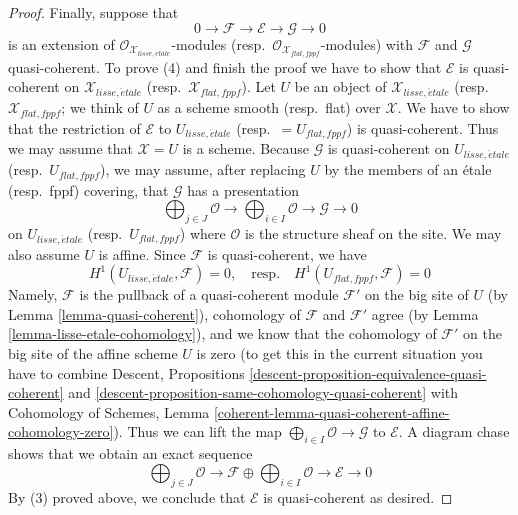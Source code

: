 \documentclass{stacks-project}
\theoremstyle{plain}
\theoremstyle{definition}
\theoremstyle{remark}
\numberwithin{equation}{subsection}
\def\etale{{\acute{e}tale}}
\begin{document}
\begin{proof}
\medskip\noindent
Finally, suppose that
$$
0 \to \mathcal{F} \to \mathcal{E} \to \mathcal{G} \to 0
$$
is an extension of $\mathcal{O}_{\mathcal{X}_{lisse,\etale}}$-modules
(resp.\ $\mathcal{O}_{\mathcal{X}_{flat,fppf}}$-modules) with $\mathcal{F}$
and $\mathcal{G}$ quasi-coherent. To prove (4) and finish the proof
we have to show that
$\mathcal{E}$ is quasi-coherent on $\mathcal{X}_{lisse,\etale}$
(resp.\ $\mathcal{X}_{flat,fppf}$). Let $U$
be an object of $\mathcal{X}_{lisse,\etale}$
(resp.\ $\mathcal{X}_{flat,fppf}$; we think of $U$ as a scheme smooth
(resp.\ flat) over $\mathcal{X}$. We have to show that the restriction
of $\mathcal{E}$ to $U_{lisse,\etale}$ (resp.\ $=U_{flat,fppf}$)
is quasi-coherent. Thus we may assume
that $\mathcal{X} = U$ is a scheme. Because $\mathcal{G}$
is quasi-coherent on $U_{lisse,\etale}$ (resp.\ $U_{flat,fppf}$),
we may assume, after replacing $U$ by the members
of an \'etale (resp.\ fppf) covering, that $\mathcal{G}$ has a
presentation
$$
\bigoplus\nolimits_{j \in J} \mathcal{O} \longrightarrow
\bigoplus\nolimits_{i \in I} \mathcal{O} \longrightarrow
\mathcal{G} \longrightarrow 0
$$
on $U_{lisse,\etale}$ (resp.\ $U_{flat,fppf}$) where $\mathcal{O}$
is the structure sheaf on the site. We may also assume $U$ is affine.
Since $\mathcal{F}$ is quasi-coherent, we have
$$
H^1(U_{lisse,\etale}, \mathcal{F}) = 0,
\quad\text{resp.}\quad
H^1(U_{flat,fppf}, \mathcal{F}) = 0
$$
Namely, $\mathcal{F}$ is the pullback of a quasi-coherent module
$\mathcal{F}'$ on the big site of $U$
(by Lemma \ref{lemma-quasi-coherent}), cohomology
of $\mathcal{F}$ and $\mathcal{F}'$ agree (by
Lemma \ref{lemma-lisse-etale-cohomology}), and we know that
the cohomology of $\mathcal{F}'$ on the big site of the affine scheme $U$
is zero (to get this in the current situation you have to
combine Descent, Propositions
\ref{descent-proposition-equivalence-quasi-coherent} and
\ref{descent-proposition-same-cohomology-quasi-coherent} with
Cohomology of Schemes, Lemma
\ref{coherent-lemma-quasi-coherent-affine-cohomology-zero}).
Thus we can lift the map
$\bigoplus_{i \in I} \mathcal{O} \to \mathcal{G}$
to $\mathcal{E}$. A diagram chase shows that we obtain
an exact sequence
$$
\bigoplus\nolimits_{j \in J} \mathcal{O} \to
\mathcal{F} \oplus \bigoplus\nolimits_{i \in I} \mathcal{O}
\to
\mathcal{E} \to 0
$$
By (3) proved above, we conclude that $\mathcal{E}$ is quasi-coherent
as desired.
\end{proof}
\end{document}
